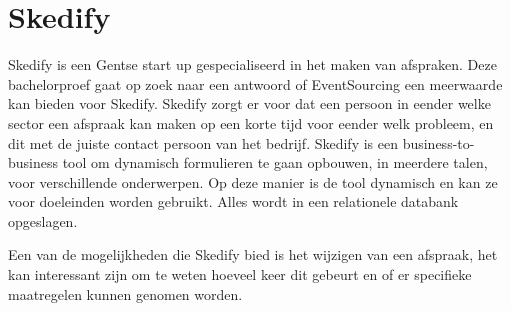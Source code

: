 
\chapter{Skedify}
\label{ch:skedify}

Skedify is een Gentse start up gespecialiseerd in het maken van afspraken. Deze bachelorproef gaat op zoek naar een antwoord of EventSourcing een meerwaarde kan bieden voor Skedify. Skedify zorgt er voor dat een persoon in eender welke sector een afspraak kan maken op een korte tijd voor eender welk probleem, en dit met de juiste contact persoon van het bedrijf. Skedify is een business-to-business tool om dynamisch formulieren te gaan opbouwen, in meerdere talen, voor verschillende onderwerpen. Op deze manier is de tool dynamisch en kan ze voor doeleinden worden gebruikt. Alles wordt in een relationele databank opgeslagen.

Een van de mogelijkheden die Skedify bied is het wijzigen van een afspraak, het kan interessant zijn om te weten hoeveel keer dit gebeurt en of er specifieke maatregelen kunnen genomen worden.